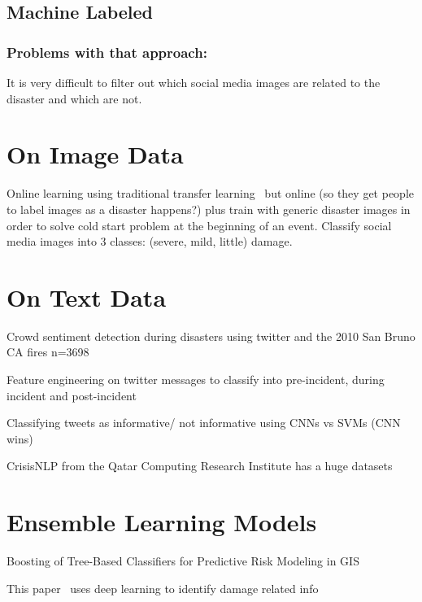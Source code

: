 \subsection{Machine Labeled}

\cite{imranPracticalExtractionDisasterrelevant2013}
\subsubsection{Problems with that approach:}
It is very difficult to filter out which social media images are related to the
disaster and which are not.


\section{On Image Data}
Online learning using traditional transfer
learning~\cite{donahueDeCAFDeepConvolutional2013} but online (so they get people
to label images as a disaster happens?) plus train with generic disaster
images in order to solve cold start problem at the beginning of an event.
Classify social media images into 3 classes: (severe, mild, little) damage.
\cite{nguyenDamageAssessmentSocial2017}



\section{On Text Data}\label{chap3:text}
Crowd sentiment detection during disasters using twitter and the 2010 San Bruno
CA fires n=3698
\cite{nagyCrowdSentimentDetection2012}

Feature engineering on twitter messages to classify into pre-incident, during
incident and post-incident
\cite{chowdhuryTweet4actUsingIncidentspecific2013}

Classifying tweets as informative/ not informative using CNNs vs SVMs (CNN wins)
\cite{carageaIdentifyingInformativeMessages2016}

CrisisNLP from the Qatar Computing Research Institute
has a huge datasets
\cite{nguyenRapidClassificationCrisisRelated}


\section{Ensemble Learning Models}
  Boosting of Tree-Based Classifiers for Predictive Risk Modeling in
  GIS~\cite{furlanelloBoostingTreeBasedClassifiers2000}
  
  This paper~\cite{mouzannarDamageIdentificationSocial2018} uses deep learning to
  identify damage related info 
  

